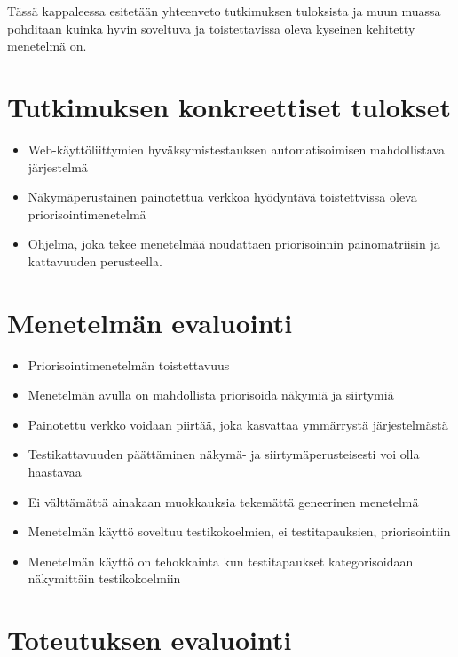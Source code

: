Tässä kappaleessa esitetään yhteenveto tutkimuksen tuloksista ja muun muassa pohditaan kuinka hyvin soveltuva ja toistettavissa oleva kyseinen kehitetty menetelmä on.

\section{Tutkimuksen konkreettiset tulokset} \label{ch:12_tutkimuksen_konkreettiset_tulokset}

  \begin{itemize}
    \item Web-käyttöliittymien hyväksymistestauksen automatisoimisen mahdollistava järjestelmä
    \item Näkymäperustainen painotettua verkkoa hyödyntävä toistettvissa oleva priorisointimenetelmä
    \item Ohjelma, joka tekee menetelmää noudattaen priorisoinnin painomatriisin ja kattavuuden perusteella.
  \end{itemize}

\section{Menetelmän evaluointi} \label{ch:12_menetelman_evaluointi}

  \begin{itemize}
    \item Priorisointimenetelmän toistettavuus
    \item Menetelmän avulla on mahdollista priorisoida näkymiä ja siirtymiä
    \item Painotettu verkko voidaan piirtää, joka kasvattaa ymmärrystä järjestelmästä
    \item Testikattavuuden päättäminen näkymä- ja siirtymäperusteisesti voi olla haastavaa
    \item Ei välttämättä ainakaan muokkauksia tekemättä geneerinen menetelmä
    \item Menetelmän käyttö soveltuu testikokoelmien, ei testitapauksien, priorisointiin
    \item Menetelmän käyttö on tehokkainta kun testitapaukset kategorisoidaan näkymittäin testikokoelmiin
  \end{itemize}

\section{Toteutuksen evaluointi} \label{ch:12_toteutuksen_evaluointi}

